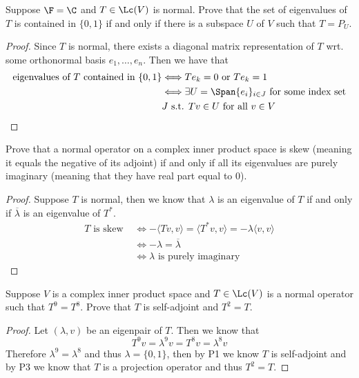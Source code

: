 \documentclass{extarticle}
\begin{document}
\begin{problem}{3}
    Suppose \(\F = \C\) and \(T \in \Lc(V)\) is normal. Prove that the set of eigenvalues
    of \(T\) is contained in \(\{0, 1\}\) if and only if there is a subspace \(U\) of \(V\) such
    that \(T = P_U\).
\end{problem}

\begin{proof}
Since \(T\) is normal, there exists a diagonal matrix representation of \(T\) wrt. some orthonormal
basis \(e_1, \ldots, e_n\). Then we have that
\begin{align*}
    \text{eigenvalues of } T \text{ contained in } \{0, 1\}
    &\Longleftrightarrow Te_k = 0 \text{ or } T e_k = 1 \\
    &\Longleftrightarrow \exists U = \Span\{e_i\}_{i \in J} \text{ for some index set}\\
    &J \text{ s.t. } Tv \in U \text{ for all } v \in V
\end{align*}
\end{proof}

\begin{problem}{4}
    Prove that a normal operator on a complex inner product space is skew (meaning it equals the negative
    of its adjoint) if and only if all its eigenvalues are purely imaginary (meaning that they have
    real part equal to 0).
\end{problem}

\begin{proof}
Suppose \(T\) is normal, then we know that \(\lambda\) is an eigenvalue of \(T\) if and only if
\(\overline{\lambda}\) is an eigenvalue of \(T^*\).
\begin{align*}
    T \text{ is skew }
    &\Longleftrightarrow -\langle Tv,v \rangle = \langle T^*v,v \rangle = - \lambda \langle v,v \rangle \\
    &\Longleftrightarrow -\lambda = \overline{\lambda} \\
    &\Longleftrightarrow \lambda \text{ is purely imaginary}
\end{align*}
\end{proof}

\begin{problem}{6}
    Suppose \(V\) is a complex inner product space and \(T \in \Lc(V)\) is a normal operator such
    that \(T^9 = T^8\). Prove that \(T\) is self-adjoint and \(T^2 = T\).
\end{problem}

\begin{proof}
Let \((\lambda, v)\) be an eigenpair of \(T\). Then we know that
\[T^9v = \lambda^9 v = T^8v = \lambda^8 v\]
Therefore \(\lambda^9 = \lambda^8\) and thus \(\lambda = \{0, 1\}\), then by P1 we know \(T\)
is self-adjoint and by P3 we know that \(T\) is a projection operator and thus \(T^2 = T\).
\end{proof}
\end{document}

